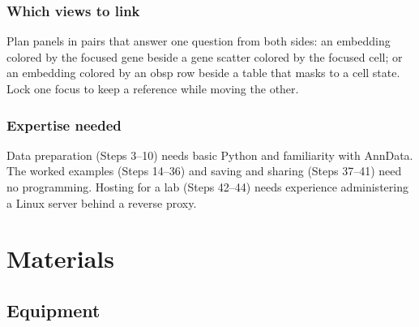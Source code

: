 \subsubsection{Which views to link}

Plan panels in pairs that answer one question from both sides: an embedding colored by the focused gene beside a gene scatter colored by the focused cell; or an embedding colored by an obsp row beside a table that masks to a cell state. Lock one focus to keep a reference while moving the other.

\subsubsection{Expertise needed}

Data preparation (Steps 3--10) needs basic Python and familiarity with AnnData. The worked examples (Steps 14--36) and saving and sharing (Steps 37--41) need no programming. Hosting for a lab (Steps 42--44) needs experience administering a Linux server behind a reverse proxy.

\section{Materials}

\subsection{Equipment}

